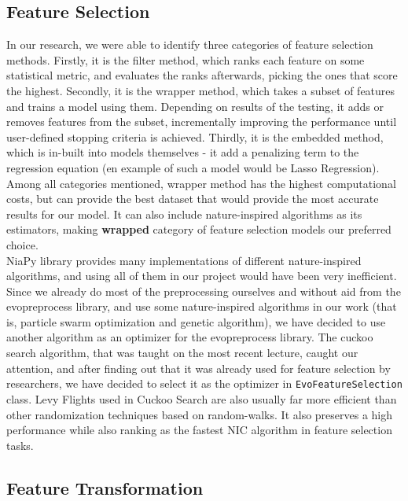 \documentclass[conference]{IEEEtran}
\begin{document}
\subsection{Feature Selection}

In our research, we were able to identify three categories of feature selection methods. Firstly, it is the filter method, which ranks each feature on some statistical metric, and evaluates the ranks afterwards, picking the ones that score the highest. Secondly, it is the wrapper method, which takes a subset of features and trains a model using them. Depending on results of the testing, it adds or removes features from the subset, incrementally improving the performance until user-defined stopping criteria is achieved. Thirdly, it is the embedded method, which is in-built into models themselves - it add a penalizing term to the regression equation (en example of such a model would be Lasso Regression)\cite{twdMLfeatsec}.\\

Among all categories mentioned, wrapper method has the highest computational costs, but can provide the best dataset that would provide the most accurate results for our model. It can also include nature-inspired algorithms as its estimators, making \textbf{wrapped} category of feature selection models our preferred choice.\\

NiaPy library provides many implementations of different nature-inspired algorithms, and using all of them in our project would have been very inefficient. Since we already do most of the preprocessing ourselves and without aid from the evopreprocess library, and use some nature-inspired algorithms in our work (that is, particle swarm optimization and genetic algorithm), we have decided to use another algorithm as an optimizer for the evopreprocess library. The cuckoo search algorithm, that was taught on the most recent lecture, caught our attention, and after finding out that it was already used for feature selection by researchers\cite{aziz2018modified}\cite{rodrigues2013bcs}, we have decided to select it as the optimizer in \texttt{EvoFeatureSelection} class. Levy Flights used in Cuckoo Search are also usually far more efficient than other randomization techniques based on random-walks. It also preserves a high performance while also ranking as the fastest NIC algorithm in feature selection tasks.\cite{karakativc2020evopreprocess}\\ 

\subsection{Feature Transformation}
\end{document}
